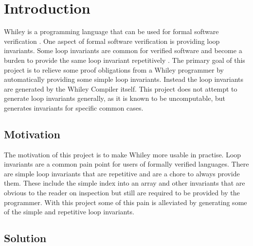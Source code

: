 \chapter{Introduction}\label{C:intro}
%
%

Whiley is a programming language that can be used for formal software
verification \cite{whiley-origin}.
One aspect of formal software verification is providing loop
invariants.
Some loop invariants are common for verified software and become a burden to
provide the same loop invariant repetitively \cite{whiley-reflection}\cite{spec-usability}.
The primary goal of this project is to relieve some proof obligations from a
Whiley programmer by automatically providing some simple loop invariants.
Instead the loop invariants are generated by the Whiley Compiler itself.
This project does not attempt to generate loop invariants generally, as it is
known to be uncomputable, but generates invariants for specific common cases.

\section{Motivation}

The motivation of this project is to make Whiley more usable in practise.
Loop invariants are a common pain point for users of formally verified
languages.
There are simple loop invariants that are repetitive and are a chore to
always provide them.
These include the simple index into an array and other invariants that
are obvious to the reader on inspection but still are required to be
provided by the programmer.
With this project some of this pain is alleviated by generating some of the simple
and repetitive loop invariants.

\section{Solution}

